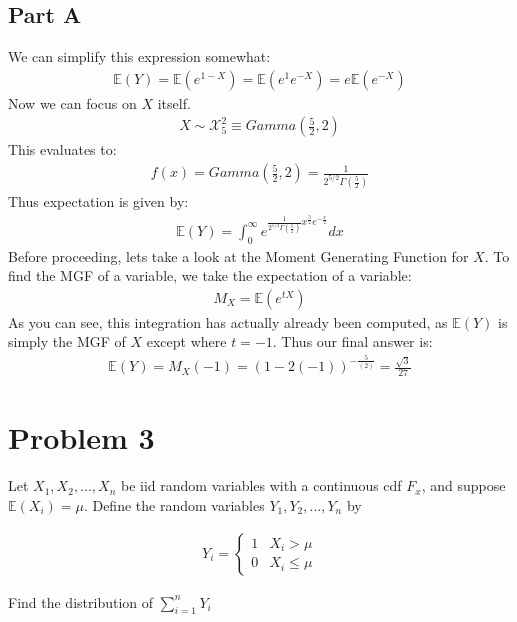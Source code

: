 \documentclass{article}
\begin{document}
\subsection*{Part A}
We can simplify this expression somewhat:
\begin{align*}
\mathbb{E}(Y) = \mathbb{E}(e^{1-X}) = \mathbb{E}(e^{1}e^{-X}) = e \mathbb{E}(e^{-X})
\end{align*}
Now we can focus on $X$ itself. 
\begin{align*}
X \sim \mathcal{X}^2_{5} \equiv Gamma(\tfrac{5}{2},2)
\end{align*}
This evaluates to:
\begin{align*}
f(x) = Gamma(\tfrac{5}{2},2) = \frac{1}{2^{5/2}\Gamma(\tfrac{5}{2})}
\end{align*}
Thus expectation is given by:
\begin{align*}
\mathbb{E}(Y) = \int_{0}^{\infty} e^{\frac{1}{2^{5/2}\Gamma(\tfrac{5}{2})} x^{\tfrac{3}{2}} e^{-\tfrac{x}{2}}} dx
\end{align*}
Before proceeding, lets take a look at the Moment Generating Function for $X$. To find the MGF of a variable, we take the expectation of a variable:
\begin{align*}
M_X = \mathbb{E}(e^{tX})
\end{align*}
As you can see, this integration has actually already been computed, as $\mathbb{E}(Y)$ is simply the MGF of $X$ except where $t=-1$. Thus our final answer is:
\begin{align*}
\boxed{ \mathbb{E}(Y) = M_X(-1) = (1-2(-1))^{-\tfrac{5}{(2)}} = \tfrac{\sqrt{3}}{27} }
\end{align*}
    
\clearpage
\section*{Problem 3}
Let $X_1, X_2,..., X_n$ be iid random variables with a continuous cdf $F_x$, and suppose
$\mathbb{E}(X_i)=\mu$. Define the random variables $Y_1, Y_2,..., Y_n$ by 

\begin{align*}
Y_i = 
\begin{cases} 
      1 & X_i > \mu \\
      0 & X_i \leq \mu  
   \end{cases}
\end{align*}

Find the distribution of $\sum^{n}_{i=1} Y_i$
\end{document}

